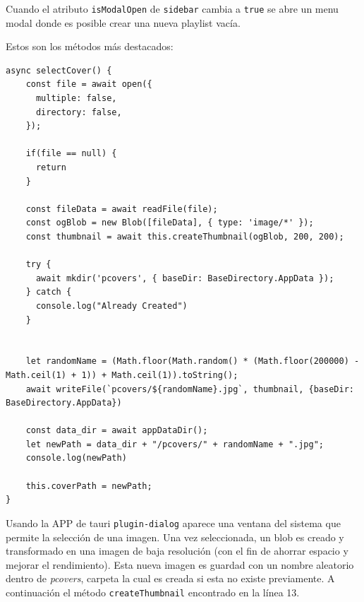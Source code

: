 \documentclass[11pt, a4paper]{article}
\begin{document}
                Cuando el atributo \verb|isModalOpen| de \verb|sidebar| cambia a \verb|true| se abre un menu modal donde es posible crear una nueva playlist vacía.

                Estos son los métodos más destacados:

                \begin{lstlisting}[caption={selectCover()}]
async selectCover() {
    const file = await open({
      multiple: false,
      directory: false,
    });

    if(file == null) {
      return
    }

    const fileData = await readFile(file);
    const ogBlob = new Blob([fileData], { type: 'image/*' });
    const thumbnail = await this.createThumbnail(ogBlob, 200, 200);

    try {
      await mkdir('pcovers', { baseDir: BaseDirectory.AppData });
    } catch {
      console.log("Already Created")
    }
    

    let randomName = (Math.floor(Math.random() * (Math.floor(200000) - Math.ceil(1) + 1)) + Math.ceil(1)).toString();
    await writeFile(`pcovers/${randomName}.jpg`, thumbnail, {baseDir: BaseDirectory.AppData})

    const data_dir = await appDataDir();
    let newPath = data_dir + "/pcovers/" + randomName + ".jpg";
    console.log(newPath)

    this.coverPath = newPath;
}
                \end{lstlisting}

                Usando la APP de tauri \verb|plugin-dialog| aparece una ventana del sistema que permite la selección de una imagen. Una vez seleccionada, un blob es creado y transformado en una imagen de baja resolución (con el fin de ahorrar espacio y mejorar el rendimiento). Esta nueva imagen es guardad con un nombre aleatorio dentro de \textit{pcovers}, carpeta la cual es creada si esta no existe previamente. A continuación el método \verb|createThumbnail| encontrado en la línea 13.
\end{document}

